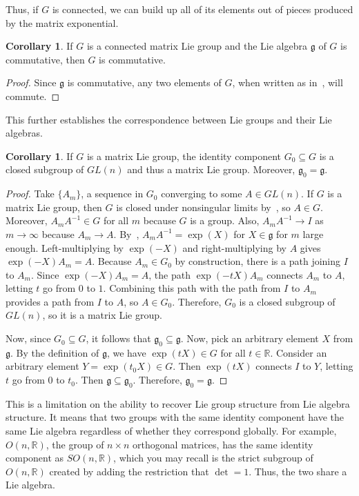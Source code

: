 \documentclass[12pt]{article}
\newcommand{\R}{\mathbb{R}}
\newcommand{\g}{\mathfrak{g}}
\newcommand{\son}{SO (n, \R)}
\theoremstyle{definition}
\theoremstyle{definition}
\newtheorem{cor}[them]{Corollary}
\theoremstyle{definition}
\theoremstyle{definition}
\theoremstyle{definition}
\theoremstyle{definition}
\theoremstyle{definition}
\theoremstyle{definition}
\begin{document}
\par{Thus, if $G$ is connected, we can build up all of its elements out of pieces produced by the matrix exponential.}

\begin{cor}
If $G$ is a connected matrix Lie group and the
Lie algebra $\g$ of $G$ is commutative, then
$G$ is commutative.
\end{cor}
\begin{proof}
Since $\g$ is commutative, any two elements of
$G$, when written as in~, will commute.
\end{proof}

\par{This further establishes the correspondence between Lie groups and their Lie algebras.}

\begin{cor}
If $G$ is a matrix Lie group, the identity
component $G_0 \subseteq G$ is a closed
subgroup of $GL(n)$ and thus a matrix Lie
group. Moreover, $\g_0 = \g$.
\end{cor}
\begin{proof}
\par{Take $\{A_m\}$, a sequence in $G_0$ converging to
some $A \in GL(n)$. If $G$ is a matrix Lie group,
then $G$ is closed under nonsingular limits
by~, so $A \in G$. Moreover, $A_m
A^{-1} \in G$ for all $m$ because $G$ is a group.
Also, $A_m A^{-1} \to I$ as $m \to \infty$ because
$A_m \to A$. By~, $A_m A^{-1} =
\exp(X)$ for $X \in \g$ for $m$ large enough.
Left-multiplying by $\exp(-X)$ and
right-multiplying by $A$ gives $\exp(-X) A_m = A$.
Because $A_m \in G_0$ by construction, there is a
path joining $I$ to $A_m$. Since $\exp(-X)A_m =
A$, the path $\exp(-tX) A_m$ connects $A_m$ to
$A$, letting $t$ go from $0$ to $1$. Combining this path
with the path from $I$ to $A_m$ provides a path
from $I$ to $A$, so $A \in G_0$. Therefore, $G_0$
is a closed subgroup of $GL(n)$, so it is a matrix
Lie group.}

\par{Now, since $G_0 \subseteq G$, it follows that
$\g_0 \subseteq \g$. Now, pick an arbitrary
element $X$ from $\g$. By the definition of $\g$,
we have $\exp(tX) \in G$ for all $t \in \R$.
Consider an arbitrary element $Y = \exp(t_0X) \in
G$. Then $\exp(tX)$ connects $I$ to $Y$, letting
$t$ go from $0$ to $t_0$. Then $\g \subseteq \g_0$.
Therefore, $\g_0 = \g$.}
\end{proof}

\par{This is a limitation on the ability to
recover Lie group structure from Lie algebra
structure. It means that two groups with the same
identity component have the same Lie algebra
regardless of whether they correspond globally.
For example, $O(n, \R)$, the group of $n \times n$
orthogonal matrices, has the same identity
component as $\son$, which you may recall is the strict
subgroup of $O(n, \R)$ created by adding the
restriction that $\det = 1$. Thus, the two share a
Lie algebra.}
\end{document}

